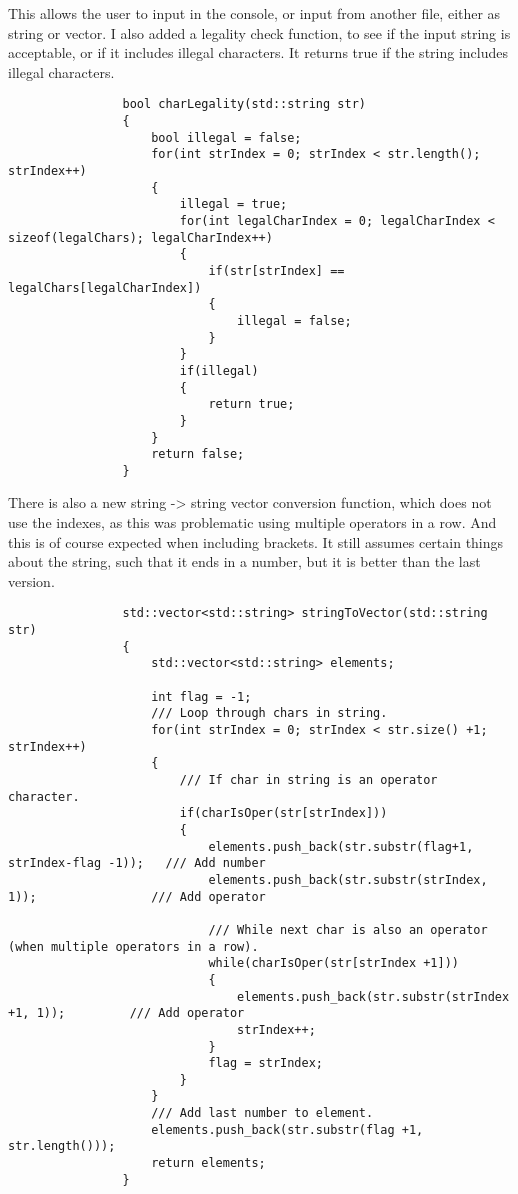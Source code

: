 \documentclass{article}
\begin{document}
			This allows the user to input in the console, or input from another file, either as string or vector.
			I also added a legality check function, to see if the input string is acceptable, or if it includes illegal characters. It returns true if the string includes illegal characters.
			\begin{lstlisting}
				bool charLegality(std::string str)
				{
					bool illegal = false;
					for(int strIndex = 0; strIndex < str.length(); strIndex++)
					{
						illegal = true;
						for(int legalCharIndex = 0; legalCharIndex < sizeof(legalChars); legalCharIndex++)
						{
							if(str[strIndex] == legalChars[legalCharIndex])
							{
								illegal = false;
							}
						}
						if(illegal)
						{
							return true;
						}
					}
					return false;
				}
			\end{lstlisting}
			
			There is also a new string -> string vector conversion function, which does not use the indexes, as this was problematic using multiple operators in a row. And this is of course expected when including brackets. It still assumes certain things about the string, such that it ends in a number, but it is better than the last version.
			\begin{lstlisting}
				std::vector<std::string> stringToVector(std::string str)
				{
					std::vector<std::string> elements;
					
					int flag = -1;
					/// Loop through chars in string.
					for(int strIndex = 0; strIndex < str.size() +1; strIndex++)
					{
						/// If char in string is an operator character.
						if(charIsOper(str[strIndex]))
						{
							elements.push_back(str.substr(flag+1, strIndex-flag -1)); 	/// Add number
							elements.push_back(str.substr(strIndex, 1));                /// Add operator
							
							/// While next char is also an operator (when multiple operators in a row).
							while(charIsOper(str[strIndex +1]))
							{
								elements.push_back(str.substr(strIndex +1, 1));    		/// Add operator
								strIndex++;
							}
							flag = strIndex;
						}
					}
					/// Add last number to element.
					elements.push_back(str.substr(flag +1, str.length()));
					return elements;
				}
			\end{lstlisting}
			
\end{document}
